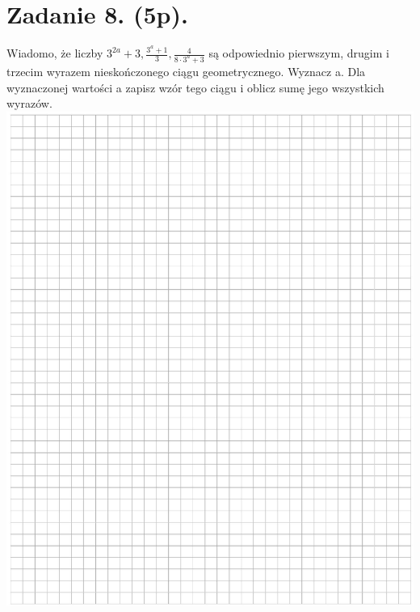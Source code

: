 \documentclass[10pt]{article}
\begin{document}
\section*{Zadanie 8. (5p).}
Wiadomo, że liczby \(3^{2 a}+3, \frac{3^{a}+1}{3}, \frac{4}{8 \cdot 3^{a}+3}\) są odpowiednio pierwszym, drugim i trzecim wyrazem nieskończonego ciągu geometrycznego. Wyznacz a. Dla wyznaczonej wartości a zapisz wzór tego ciągu i oblicz sumę jego wszystkich wyrazów.\\
\includegraphics[max width=\textwidth, center]{2024_11_21_498389c978c770348ebcg-06}
\end{document}
